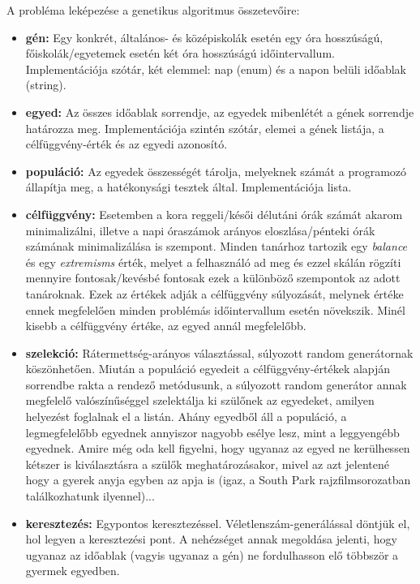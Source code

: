 
\noindent A probléma leképezése a genetikus algoritmus összetevőire:

\begin{itemize}
	\item \textbf{gén:} Egy konkrét, általános- és középiskolák esetén egy óra hosszúságú, 	          főiskolák/egyetemek esetén két óra hosszúságú időintervallum. Implementációja szótár, két elemmel: nap (enum) és a napon belüli időablak (string).
	\item \textbf{egyed:} Az összes időablak sorrendje, az egyedek mibenlétét a gének sorrendje határozza meg. Implementációja szintén szótár, elemei a gének listája, a célfüggvény-érték és az
	egyedi azonosító.
	\item \textbf{populáció:} Az egyedek összességét tárolja, melyeknek számát a programozó állapítja meg, a hatékonysági tesztek által. Implementációja lista.
	\item \textbf{célfüggvény:} Esetemben a kora reggeli/késői délutáni órák számát akarom minimalizálni, illetve a napi óraszámok arányos eloszlása/pénteki órák számának minimalizálása is szempont. Minden tanárhoz tartozik egy \textsl{balance} és egy \textsl{extremisms} érték,
	melyet a felhasználó ad meg és ezzel skálán rögzíti mennyire fontosak/kevésbé fontosak ezek a különböző szempontok az adott tanároknak. Ezek az értékek adják a célfüggvény súlyozását, melynek értéke ennek megfelelően minden problémás időintervallum esetén növekszik. Minél kisebb a célfüggvény értéke, az egyed annál megfelelőbb.
	\item \textbf{szelekció:} Rátermettség-arányos választással, súlyozott random generátornak köszönhetően. Miután a populáció egyedeit a célfüggvény-értékek alapján sorrendbe rakta a rendező metódusunk, a súlyozott random generátor annak megfelelő valószínűséggel szelektálja ki szülőnek az egyedeket, amilyen helyezést foglalnak el a listán. Ahány egyedből áll a populáció, a legmegfelelőbb egyednek annyiszor nagyobb esélye lesz, mint a leggyengébb egyednek. Amire még oda kell figyelni, hogy ugyanaz az egyed ne kerülhessen kétszer is kiválasztásra a szülők meghatározásakor, mivel az azt jelentené hogy a gyerek anyja egyben az apja is (igaz, a South Park rajzfilmsorozatban találkozhatunk ilyennel)...
	\item \textbf{keresztezés:} Egypontos keresztezéssel. Véletlenszám-generálással döntjük el, hol legyen a keresztezési pont. A nehézséget annak megoldása jelenti, hogy ugyanaz az időablak (vagyis ugyanaz a gén) ne fordulhasson elő többször a gyermek egyedben.
\end{itemize}

